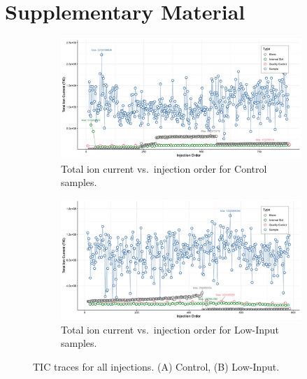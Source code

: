 \documentclass[10pt,letterpaper]{article}
\newcommand{\beginsupplement}{%
  \setcounter{table}{0}%
  \renewcommand{\thetable}{S\arabic{table}}%
  \setcounter{figure}{0}%
  \renewcommand{\thefigure}{S\arabic{figure}}}
\begin{document}
\FloatBarrier
\section*{Supplementary Material}
\beginsupplement


\begin{figure}[htp]
  \centering

  \begin{subfigure}[t]{\textwidth}
    \includegraphics[width=\linewidth]{fig/supp/SuppFig_1A_TIC_Control}
    \caption{Total ion current vs.\ injection order for Control samples.}
    \label{fig:S1A}
  \end{subfigure}

  \vspace{1em}

  \begin{subfigure}[t]{\textwidth}
    \includegraphics[width=\linewidth]{fig/supp/SuppFig_1B_TIC_LowInput.png}
    \caption{Total ion current vs.\ injection order for Low-Input samples.}
    \label{fig:S1B}
  \end{subfigure}

  \caption{TIC traces for all injections.  (A) Control, (B) Low-Input.}
  \label{fig:S1}
\end{figure}
\end{document}
